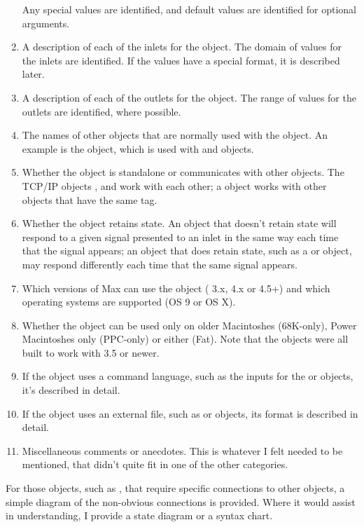\begin{enumerate}[  1)]
Any special values are identified, and default values are identified for optional arguments.
\item A description of each of the inlets for the object.
The domain of values for the inlets are identified.
If the values have a special format, it is described later.
\item A description of each of the outlets for the object.
The range of values for the outlets are identified, where possible.
\item The names of other objects that are normally used with the object.
An example is the  object, which is used with  and  objects.
\item Whether the object is standalone or communicates with other objects.
The TCP/IP objects ,  and  work with each other;
a  object works with other  objects that have the same tag.
\item Whether the object retains state.
An object that doesn't retain state will respond to a given signal presented to an inlet in the same way each time that
the signal appears;
an object that does retain state, such as a  or  object, may respond differently each time
that the same signal appears.
\item Which versions of Max can use the object (\MaxName{} 3.x, \MaxName{} 4.x or \MaxName{} 4.5+) and which operating systems are supported (OS 9 or OS X).
\item Whether the object can be used only on older Macintoshes (68K-only), Power Macintoshes only (PPC-only) or either (Fat).
Note that the objects were all built to work with \MaxName{} 3.5 or newer.
\item If the object uses a command language, such as the inputs for the  or  objects, it's described in
detail.
\item If the object uses an external file, such as  or  objects, its format is described in detail.
\item Miscellaneous comments or anecdotes.
This is whatever I felt needed to be mentioned, that didn't quite fit in one of the other categories.
\end{enumerate}

For those objects, such as , that require specific connections to other objects, a simple diagram of the non-obvious
connections is provided.
Where it would assist in understanding, I provide a state diagram or a syntax chart.


